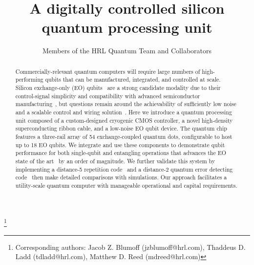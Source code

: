 \documentclass[aps,prl,twocolumn,superscriptaddress,nobibnotes,10pt,floatfix]{revtex4-2}
\newcommand{\abst}[1]{\begin{abstract}
		#1
\end{abstract}}
\newcommand{\abst}[1]{\abstract{#1}}
\begin{document}
	\title{A digitally controlled silicon quantum processing unit}
	\author{Members of the HRL Quantum Team and Collaborators}

	\newcommand{\emailstatement}{Jacob Z. Blumoff (jzblumoff@hrl.com), Thaddeus D. Ladd (tdladd@hrl.com), Matthew D. Reed (mdreed@hrl.com)}
	\ifarxiv
	\thanks{Corresponding authors: \emailstatement}
	\else

	\fi

	\abst{
		Commercially-relevant quantum computers will require large numbers of high-performing qubits that can be manufactured, integrated, and controlled at scale.
		Silicon exchange-only (EO) qubits~\cite{
			bacon_universal_2000,
			divincenzo_universal_2000,
			fong_universal_2011,
			langrock_reset-if-leaked_2020,
			andrews_quantifying_2019,
			ha_flexible_2022,
			weinstein_universal_2023,
			ha_two-dimensional_2025,
			sun_full-permutation_2024,
			madzik_operating_2025}
		are a strong candidate modality due to their control-signal simplicity and  compatibility with advanced semiconductor manufacturing~\cite{
			zwerver_qubits_2022,
			steinacker_industry-compatible_2025,
			xue_cmos-based_2021},
		but questions remain around the achievability of sufficiently low noise and a scalable control and wiring solution~\cite{
			xue_cmos-based_2021,
			patra_cryo-cmos_2018,
			mehrpoo_benefits_2019,
			geck_control_2019,
			pauka_cryogenic_2021,
			bartee_spin-qubit_2025,
			kiene_134_2021}.
		Here we introduce a quantum processing unit composed of a custom-designed cryogenic CMOS controller, a novel high-density superconducting ribbon cable, and a low-noise EO qubit device.
		The quantum chip features a three-rail array of 54 exchange-coupled quantum dots, configurable to host up to 18 EO qubits.
		We integrate and use these components to demonstrate qubit performance for both single-qubit and entangling operations that advances the EO state of the art~\cite{weinstein_universal_2023,ha_two-dimensional_2025,madzik_operating_2025} by an order of magnitude.
		We further validate this system by implementing a distance-5 repetition code~\cite{google_exponential_2021} and a \mbox{distance-2} quantum error detecting code~\cite{
			linke_fault-tolerant_2017,
			dam_end--end_2024,
			takita_IBMrep_2017,
			zhang_422_2026,
			reichardt_422_2025,
			undseth_weight-four_2026}
		then make detailed comparisons with simulations.
		Our approach facilitates a utility-scale quantum computer with manageable operational and capital requirements.
	}
\end{document}
